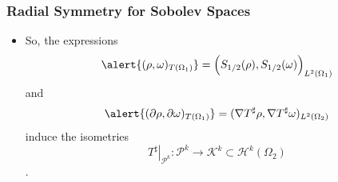 \documentclass[]{beamer}
\newcommand{\RR}{\ensuremath{\mathbb R}}  %
\newcommand{\HH}{\ensuremath{\mathscr H}} %
\newcommand{\KK}{\ensuremath{\mathscr K}}
\newcommand{\pp}{\ensuremath{\mathscr P}}
\newcommand{\ds}{\displaystyle}
\renewcommand{\bar}{\overline}
\newcommand{\del}{\partial}
\begin{document}
\begin{frame}[t]
  \frametitle{Radial Symmetry for Sobolev Spaces}
  \begin{itemize}
    \itemsep 1.2em
    \item So, the expressions
    $$
    \alert{(\rho,\omega)_{T(\Omega_1)}} = \Big( S_{1/2}(\rho),S_{1/2}(\omega) \Big)_{L^2(\Omega_1)}  %
    $$ 
      and
    $$
      \alert{(\del \rho,\del \omega)_{T(\Omega_1)}}  =  (\nabla T^\sharp \rho, \nabla T^\sharp \omega)_{L^2(\Omega_2)}   $$
      induce the \alert{isometries $$\left.T^\sharp\right|_{\pp^k}: \pp^k \to \KK^k \subset \HH^k(\Omega_2)$$}.

  \end{itemize}
\end{frame}

\end{document}
